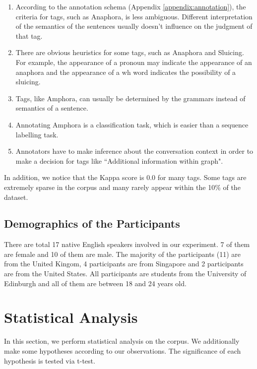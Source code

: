 \documentclass[bsc,frontabs,twoside,singlespacing,parskip,deptreport]{infthesis}     %
\begin{document}
\begin{enumerate}

    \item According to the annotation schema (Appendix \ref{appendix:annotation}), the criteria for tags, such as Anaphora, is less ambiguous. Different interpretation of the semantics of the sentences usually doesn't influence on the judgment of that tag.
    
   \item There are obvious heuristics for some tags, such as Anaphora and Sluicing. For example, the appearance of a pronoun may indicate the appearance of an anaphora and the appearance of a wh word indicates the possibility of a sluicing. 

   \item Tags, like Amphora, can usually be determined by the grammars instead of semantics of a sentence. 
 
   \item Annotating Amphora is a classification task, which is easier than a sequence labelling task.
   
   \item Annotators have to make inference about the conversation context in order to make a decision for tags like ``Additional information within graph".
   
\end{enumerate}

In addition, we notice that the Kappa score is 0.0 for many tags. Some tags are extremely sparse in the corpus and many rarely appear within the 10\% of the dataset.

\subsection*{Demographics of the Participants}

There are total 17 native English speakers involved in our experiment. 7 of them are female and 10 of them are male. The majority of the participants (11) are from the United Kingom, 4 participants are from Singapore and 2 participants are from the United States. All participants are students from the University of Edinburgh and all of them are between 18 and 24 years old.

\section{Statistical Analysis}

In this section, we perform statistical analysis on the corpus. We additionally make some hypotheses according to our observations. The significance of each hypothesis is tested via t-test.
\end{document}

